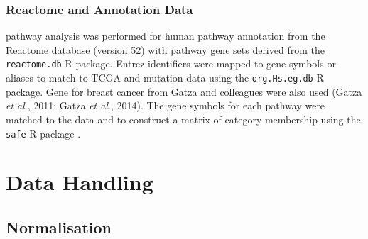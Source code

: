 

\subsubsection{Reactome and Annotation Data} \label{methods:gene_set}

\Gls{pathway} analysis was performed for human \gls{pathway} annotation from the Reactome database (version 52) with \gls{pathway} gene sets derived from the \texttt{reactome.db} R package. Entrez identifiers were mapped to gene symbols or aliases to match to \gls{TCGA}  and \gls{mutation} data using the \texttt{org.Hs.eg.db} R package. Gene  for breast cancer from Gatza and colleagues were also used (Gatza \textit{et al}., 2011; Gatza \textit{et al}., 2014). The gene symbols for each pathway were matched to the  data and to construct a matrix of category membership using the \texttt{safe} R package \citep{safe}.

\section{Data Handling}

\subsection{Normalisation}

